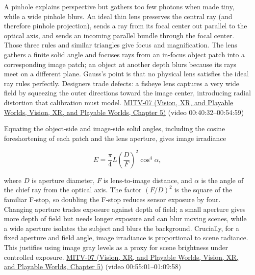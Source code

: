 A pinhole explains perspective but gathers too few photons when made tiny, while a wide pinhole blurs. An ideal thin lens preserves the central ray (and therefore pinhole projection), sends a ray from its focal center out parallel to the optical axis, and sends an incoming parallel bundle through the focal center. Those three rules and similar triangles give focus and magnification. The lens gathers a finite solid angle and focuses rays from an in-focus object patch into a corresponding image patch; an object at another depth blurs because its rays meet on a different plane. Gauss's point is that no physical lens satisfies the ideal ray rules perfectly. Designers trade defects: a fisheye lens captures a very wide field by squeezing the outer directions toward the image center, introducing radial distortion that calibration must model. \href{../07-Vision-XR-and-Playable-Worlds/main.pdf\#nameddest=04-visual-computing-ii-ch036-mitv-07---gradient-space-reflectance-map-image-irradiance-equation-gnomonic-projection}{MITV-07 (Vision, XR, and Playable Worlds, Vision, XR, and Playable Worlds, Chapter 5)} (video 00:40:32--00:54:59)

Equating the object-side and image-side solid angles, including the cosine foreshortening of each patch and the lens aperture, gives image irradiance

\[
E=\frac{\pi}{4}L\left(\frac{D}{F}\right)^2\cos^4\alpha,
\]

where \(D\) is aperture diameter, \(F\) is lens-to-image distance, and \(\alpha\) is the angle of the chief ray from the optical axis. The factor \((F/D)^2\) is the square of the familiar F-stop, so doubling the F-stop reduces sensor exposure by four. Changing aperture trades exposure against depth of field; a small aperture gives more depth of field but needs longer exposure and can blur moving scenes, while a wide aperture isolates the subject and blurs the background. Crucially, for a fixed aperture and field angle, image irradiance is proportional to scene radiance. This justifies using image gray levels as a proxy for scene brightness under controlled exposure. \href{../07-Vision-XR-and-Playable-Worlds/main.pdf\#nameddest=04-visual-computing-ii-ch036-mitv-07---gradient-space-reflectance-map-image-irradiance-equation-gnomonic-projection}{MITV-07 (Vision, XR, and Playable Worlds, Vision, XR, and Playable Worlds, Chapter 5)} (video 00:55:01--01:09:58)

